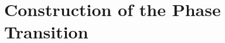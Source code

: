 \documentclass[main.tex]{subfiles}
\begin{document}
\chapter{Construction of the Phase Transition}\label{apx:phase_transition}
\end{document}
